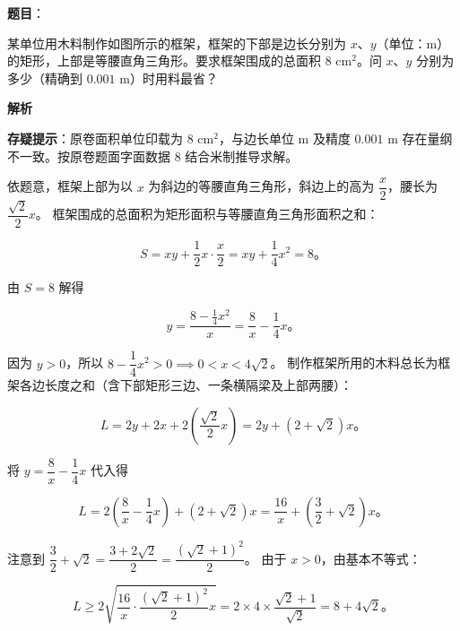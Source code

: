 \begin{answer}

\textbf{题目}：

某单位用木料制作如图所示的框架，框架的下部是边长分别为 $x$、$y$（单位：$\mathrm{m}$）的矩形，上部是等腰直角三角形。要求框架围成的总面积 $8\text{ cm}^2$。问 $x$、$y$ 分别为多少（精确到 $0.001\text{ m}$）时用料最省？
\nopagebreak[4]
\begin{center}\end{center}
\nopagebreak[4]
\textbf{解析}

\begin{gktip}
\textbf{存疑提示}：原卷面积单位印载为 $8\text{ cm}^2$，与边长单位 $\mathrm{m}$ 及精度 $0.001\text{ m}$ 存在量纲不一致。按原卷题面字面数据 $8$ 结合米制推导求解。
\end{gktip}

依题意，框架上部为以 $x$ 为斜边的等腰直角三角形，斜边上的高为 $\dfrac{x}{2}$，腰长为 $\dfrac{\sqrt{2}}{2}x$。
框架围成的总面积为矩形面积与等腰直角三角形面积之和：

\nopagebreak[4]
\[
S = xy + \dfrac{1}{2}x \cdot \dfrac{x}{2} = xy + \dfrac{1}{4}x^2 = 8\mbox{。}
\]

由 $S = 8$ 解得

\nopagebreak[4]
\[
y = \dfrac{8 - \frac{1}{4}x^2}{x} = \dfrac{8}{x} - \dfrac{1}{4}x\mbox{。}
\]

因为 $y > 0$，所以 $8 - \dfrac{1}{4}x^2 > 0 \implies 0 < x < 4\sqrt{2}$。
制作框架所用的木料总长为框架各边长度之和（含下部矩形三边、一条横隔梁及上部两腰）：

\nopagebreak[4]
\[
L = 2y + 2x + 2\left(\dfrac{\sqrt{2}}{2}x\right) = 2y + (2 + \sqrt{2})x\mbox{。}
\]

将 $y = \dfrac{8}{x} - \dfrac{1}{4}x$ 代入得

\nopagebreak[4]
\[
L = 2\left(\dfrac{8}{x} - \dfrac{1}{4}x\right) + (2 + \sqrt{2})x = \dfrac{16}{x} + \left(\dfrac{3}{2} + \sqrt{2}\right)x\mbox{。}
\]

注意到 $\dfrac{3}{2} + \sqrt{2} = \dfrac{3 + 2\sqrt{2}}{2} = \dfrac{(\sqrt{2} + 1)^2}{2}$。
由于 $x > 0$，由基本不等式：

\nopagebreak[4]
\[
L \geqslant 2\sqrt{\dfrac{16}{x} \cdot \dfrac{(\sqrt{2} + 1)^2}{2}x} = 2 \times 4 \times \dfrac{\sqrt{2} + 1}{\sqrt{2}} = 8 + 4\sqrt{2}\mbox{。}
\]


\end{answer}
